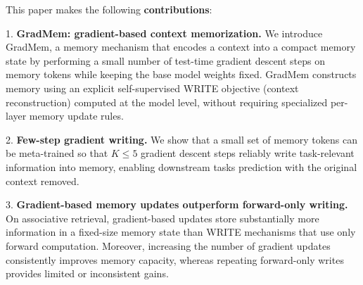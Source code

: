 \documentclass{article}
\theoremstyle{plain}
\theoremstyle{definition}
\theoremstyle{remark}
\begin{document}
This paper makes the following \textbf{contributions}:



1. \textbf{GradMem: gradient-based context memorization.}
We introduce GradMem, a memory mechanism that encodes a context into a compact memory state by performing a small number of test-time gradient descent steps on memory tokens while keeping the base model weights fixed. 
GradMem constructs memory using an explicit self-supervised WRITE objective (context reconstruction) computed at the model level, without requiring specialized per-layer memory update rules.

2. \textbf{Few-step gradient writing.} We show that a small set of memory tokens can be meta-trained so that $K \leq 5$ gradient descent steps reliably write task-relevant information into memory, enabling downstream tasks prediction with the original context removed.



3. \textbf{Gradient-based memory updates outperform forward-only writing.}
On associative retrieval, gradient-based updates store substantially more information in a fixed-size memory state than WRITE mechanisms that use only forward computation. Moreover, increasing the number of gradient updates consistently improves memory capacity, whereas repeating forward-only writes provides limited or inconsistent gains.
\end{document}

